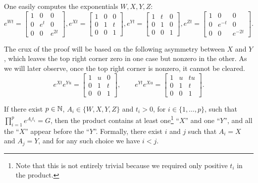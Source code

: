 One easily computes the exponentials $W,X,Y,Z$:
\[
e^{Wt}=\begin{bmatrix}1&0&0\\0&e^t&0\\0&0&e^{2t}\end{bmatrix},
e^{Xt}=\begin{bmatrix}1&0&0\\0&1&t\\0&0&1\end{bmatrix},
e^{Yt}=\begin{bmatrix}1&t&0\\0&1&0\\0&0&1\end{bmatrix},
e^{Zt}=\begin{bmatrix}1&0&0\\0&e^{-t}&0\\0&0&e^{-2t}\end{bmatrix}.
\]

The crux of the proof will be based on the following asymmetry between $X$ and $Y$,
which leaves the top right corner zero in one case but nonzero in the other. As we will later
observe, once the top right corner is nonzero, it cannot be cleared.
\[
e^{Xt}e^{Yu}=\begin{bmatrix}1&u&0\\0&1&t\\0&0&1\end{bmatrix},\qquad
e^{Yt}e^{Xu}=\begin{bmatrix}1&u&tu\\0&1&t\\0&0&1\end{bmatrix}.
\]

\begin{proposition}\label{prop:eq_has_forced_order}
If there exist $p\in\mathbb{N}$, $A_{i}\in\lbrace W,X,Y,Z\rbrace$ and $t_{i}>0$, for $i\in\lbrace 1,\ldots,p\rbrace$,
such that $\prod_{i=1}^{p} e^{A_{i}t_{i}}=G$, then the product contains at least one\footnote{Note
that this is not entirely trivial because we required only positive $t_{i}$ in the product.}
``$X$'' and one ``$Y$'', and all the ``$X$'' appear before the ``$Y$''.
Formally, there exist $i$ and $j$ such that $A_{i}=X$ and $A_{j}=Y$, and for
any such choice we have $i<j$.
\end{proposition}

